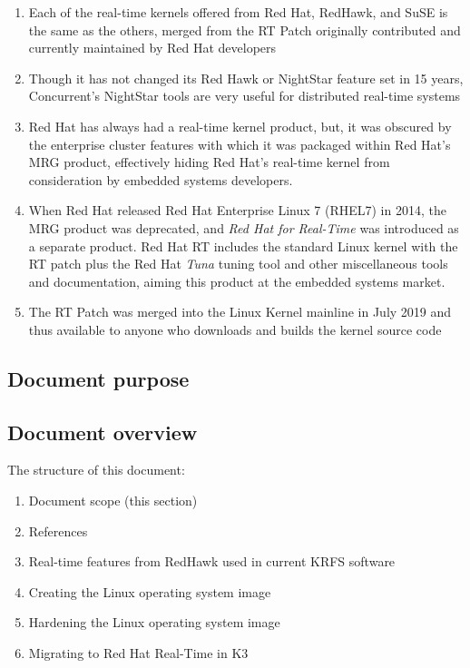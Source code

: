 \documentclass[12pt]{article}
\begin{document}
\begin{enumerate}
    \item Each of the real-time kernels offered from Red Hat, RedHawk, and SuSE
is the same as the others, merged from the RT Patch originally contributed and
currently maintained by Red Hat developers
    \item Though it has not changed its Red Hawk or NightStar feature set in 15
years, Concurrent's NightStar tools are very useful for distributed real-time
systems
    \item Red Hat has always had a real-time kernel product, but, it was
obscured by the enterprise cluster features with which it was packaged within
Red Hat's MRG product, effectively hiding Red Hat's real-time kernel from
consideration by embedded systems developers.
    \item When Red Hat released Red Hat Enterprise Linux 7 (RHEL7) in 2014, the
MRG product was deprecated, and \emph{Red Hat for Real-Time} was introduced as a
separate product.  Red Hat RT includes the standard Linux kernel with the RT
patch plus the Red Hat \emph{Tuna} tuning tool and other miscellaneous tools and
documentation, aiming this product at the embedded systems market.
    \item The RT Patch was merged into the Linux Kernel mainline in July 2019
and thus available to anyone who downloads and builds the kernel source code
\end{enumerate}



\subsection{Document purpose}
%


\subsection{Document overview}
The structure of this document:

\begin{enumerate}
    \item Document scope (this section)
    \item References
    \item Real-time features from RedHawk used in current KRFS software
    \item Creating the Linux operating system image
    \item Hardening the Linux operating system image
    \item Migrating to Red Hat Real-Time in K3
\end{enumerate}
\end{document}

